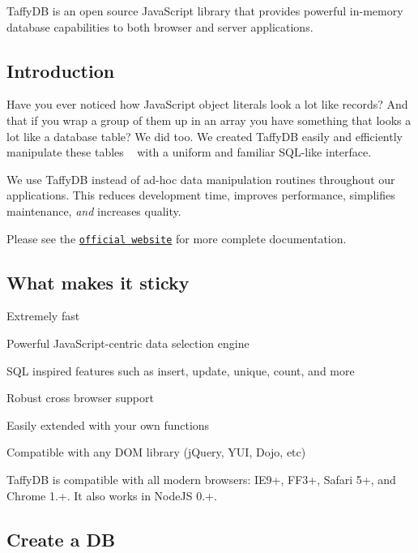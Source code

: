 Taffy\+DB is an open source Java\+Script library that provides powerful in-\/memory database capabilities to both browser and server applications.

\subsection*{Introduction}

Have you ever noticed how Java\+Script object literals look a lot like records? And that if you wrap a group of them up in an array you have something that looks a lot like a database table? We did too. We created Taffy\+DB easily and efficiently manipulate these \textquotesingle{}tables\textquotesingle{} ~\newline
with a uniform and familiar S\+Q\+L-\/like interface.

We use Taffy\+DB instead of ad-\/hoc data manipulation routines throughout our applications. This reduces development time, improves performance, simplifies maintenance, {\itshape and} increases quality.

Please see the \href{http://www.taffydb.com}{\tt official website} for more complete documentation.

\subsection*{What makes it sticky}


\begin{DoxyItemize}
\item Extremely fast
\item Powerful Java\+Script-\/centric data selection engine
\item S\+QL inspired features such as insert, update, unique, count, and more
\item Robust cross browser support
\item Easily extended with your own functions
\item Compatible with any D\+OM library (j\+Query, Y\+UI, Dojo, etc)
\end{DoxyItemize}

Taffy\+DB is compatible with all modern browsers\+: I\+E9+, F\+F3+, Safari 5+, and Chrome 1.+. It also works in Node\+JS 0.+.

\subsection*{Create a DB}

